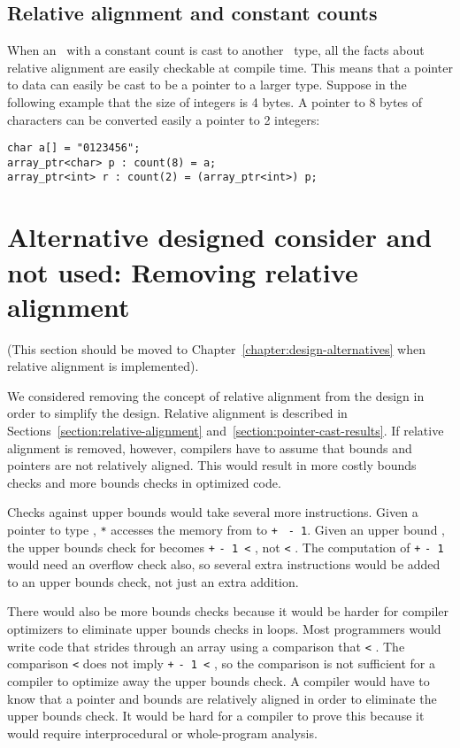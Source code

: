 \subsection{Relative alignment and constant counts}

When an \arrayptr\ with a constant count is cast to another
\arrayptr\ type, all the facts about relative alignment are
easily checkable at compile time. This means that a pointer to data can
easily be cast to be a pointer to a larger type. Suppose in the
following example that the size of integers is 4 bytes. A pointer to 8
bytes of characters can be converted easily a pointer to 2 integers:

\begin{lstlisting}
char a[] = "0123456";
array_ptr<char> p : count(8) = a;
array_ptr<int> r : count(2) = (array_ptr<int>) p;
\end{lstlisting}

\section{Alternative designed consider and not used: Removing relative alignment}
\label{section:design-alternatives:always-unaligned}

(This section should be moved to Chapter~\ref{chapter:design-alternatives} when relative
alignment is implemented).

We considered removing the concept of relative alignment from the design in order
to simplify the design. 
Relative alignment is described in Sections~\ref{section:relative-alignment}
and~\ref{section:pointer-cast-results}.  If relative alignment
is removed, however, compilers have to assume that bounds and pointers are
not relatively aligned.   This would result in more costly bounds checks and
more bounds checks in optimized code.

Checks against upper bounds would  take several more instructions.
Given a pointer  to type , \lstinline|*| accesses the memory from
 to  \lstinline|+|  \lstinline| - 1|. Given an upper bound , the
upper bounds check for  becomes  \lstinline|+|  \lstinline|- 1 <|
, not  \lstinline|<| .  The
computation of  \lstinline|+|  \lstinline|- 1| would need an overflow 
check also,  so several extra instructions would be added to an upper bounds check, 
not just an extra addition.

There would also be more bounds checks because it would be harder for compiler optimizers
to eliminate upper bounds checks in loops.  Most programmers would write code that
strides through an array using a comparison that
 \lstinline|<| . The comparison 
 \lstinline|<|  does not imply
 \lstinline|+|  \lstinline|- 1 <| , so the comparison is
not sufficient for a compiler to optimize away
the upper bounds check. A compiler would have to know that a pointer
and bounds are relatively aligned in order to eliminate the upper bounds
check. It would be hard for a compiler to prove this because it would
require interprocedural or whole-program analysis.

